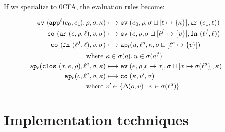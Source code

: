 \documentclass[preprint,onecolumn,9pt]{sigplanconf} %
\begin{document}
If we specialize to 0CFA, the evaluation rules become:


\newcommand{\ext}[3]{#1\sqcup[#2\mapsto#3]}

\begin{align*}
\ev{\sapp[^\mlab]{\mexpi0}{\mexpi1},\menv,\msto,\mkont} &\machstep
\ev{\mexpi{0},\menv,\ext{\msto}{\mlab}{\{\mkont\}},\kar{\mexpi{1},\mlab}}
\\
\co{\kar{\mexp,\menv,\mlab},\mval,\msto} & \machstep
\ev{\mexp,\menv,\ext{\msto}{\mlab^f}{\{\mval\}},\kfn{\mlab^f,\mlab}}
\\
\co{\kfn{\mlab^f,\mlab},\mval,\msto} & \machstep
\ap[_\mlab]{\mvalx{u},\mlab^a,\mkont,\ext{\msto}{\mlab^a}{\{\mval\}}}
\\
\text{ where } &\mkont \in \msto(\maddr), \mvalx{u} \in \msto(\maddr^f)
\\
\ap[_\mlab]{\clos{\mvar,\mexp,\menv},\mlab^a, \msto,\mkont} & \machstep
\ev{\mexp,\menv[\mvar\mapsto\mvar],\ext{\msto}{\mvar}{\msto(\mlab^a)},\mkont}
\\
\ap[_\mlab]{\mop,\mlab^a,\msto,\mkont} & \machstep
\co{\mkont,\mval',\msto}
\\
\text{ where }& \mval'\in \{\interpdelta(\mop,\mval) \mid \mval \in \msto(\mlab^a)\}
\end{align*}



\section{Implementation techniques}
\label{sec:opt}
\end{document}
